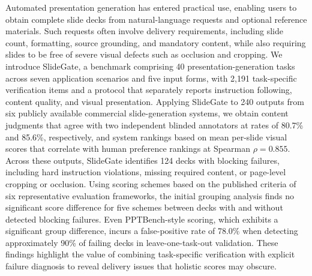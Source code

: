 Automated presentation generation has entered practical use, enabling users to obtain complete slide decks from natural-language requests and optional reference materials. Such requests often involve delivery requirements, including slide count, formatting, source grounding, and mandatory content, while also requiring slides to be free of severe visual defects such as occlusion and cropping. We introduce SlideGate, a benchmark comprising 40 presentation-generation tasks across seven application scenarios and five input forms, with 2,191 task-specific verification items and a protocol that separately reports instruction following, content quality, and visual presentation. Applying SlideGate to 240 outputs from six publicly available commercial slide-generation systems, we obtain content judgments that agree with two independent blinded annotators at rates of 80.7\% and 85.6\%, respectively, and system rankings based on mean per-slide visual scores that correlate with human preference rankings at Spearman \(\rho=0.855\). Across these outputs, SlideGate identifies 124 decks with blocking failures, including hard instruction violations, missing required content, or page-level cropping or occlusion. Using scoring schemes based on the published criteria of six representative evaluation frameworks, the initial grouping analysis finds no significant score difference for five schemes between decks with and without detected blocking failures. Even PPTBench-style scoring, which exhibits a significant group difference, incurs a false-positive rate of 78.0\% when detecting approximately 90\% of failing decks in leave-one-task-out validation. These findings highlight the value of combining task-specific verification with explicit failure diagnosis to reveal delivery issues that holistic scores may obscure.

